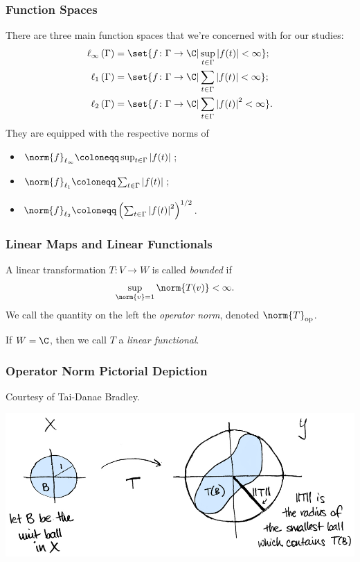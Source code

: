 \documentclass{beamer-custom}
\DeclareMathOperator{\op}{op}
\begin{document}
\begin{frame}
  \frametitle{Function Spaces}
  There are three main function spaces that we're concerned with for our studies:
  { \footnotesize \begin{align*}
    \ell_{\infty}\left( \Gamma \right) & =\set{f\colon \Gamma\rightarrow \C | \sup_{t\in\Gamma}\left\vert f(t) \right\vert < \infty};\\
    \ell_{1}\left( \Gamma \right) &= \set{f\colon \Gamma\rightarrow \C | \sum_{t\in\Gamma}\left\vert f(t) \right\vert < \infty};\\
    \ell_2\left( \Gamma \right) &= \set{f\colon \Gamma\rightarrow \C | \sum_{t\in\Gamma}\left\vert f(t) \right\vert^2 < \infty}.
  \end{align*}}\pause
  They are equipped with the respective norms of
  \begin{itemize}
    \item $\norm{f}_{\ell_{\infty}} \coloneqq \sup_{t\in\Gamma}\left\vert f(t) \right\vert$;
    \item $\norm{f}_{\ell_1}\coloneqq \sum_{t\in\Gamma}\left\vert f(t) \right\vert$;
    \item $\norm{f}_{\ell_2}\coloneqq \left( \sum_{t\in\Gamma}\left\vert f(t) \right\vert^2 \right)^{1/2}$.
  \end{itemize}
\end{frame}
\begin{frame}
  \frametitle{Linear Maps and Linear Functionals}
  A linear transformation $T\colon V\rightarrow W$ is called \textit{bounded} if
  \begin{align*}
    \sup_{\norm{v}=1}\norm{T(v)} &< \infty.
  \end{align*}\pause
  We call the quantity on the left the \textit{operator norm}, denoted $\norm{T}_{\op}$.\newline

  If $W = \C$, then we call $T$ a \textit{linear functional}.
\end{frame}
\begin{frame}
  \frametitle{Operator Norm Pictorial Depiction}
  Courtesy of Tai-Danae Bradley.
  \begin{center}
    \includegraphics{images/operator_norm_depiction.png}
  \end{center}
\end{frame}
\end{document}
